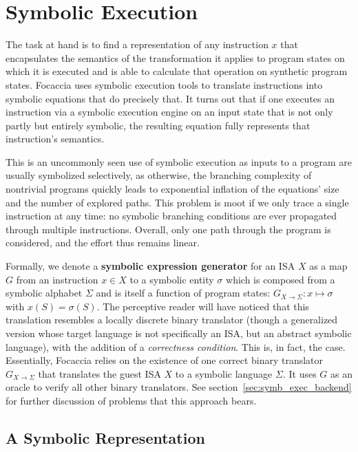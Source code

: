 \section{Symbolic Execution}\label{sec:symb_exec}

The task at hand is to find a representation of any instruction $x$ that encapsulates the semantics of the
transformation it applies to program states on which it is executed and is able to calculate that operation on synthetic
program states. Focaccia uses symbolic execution tools to translate instructions into symbolic equations that do
precisely that. It turns out that if one executes an instruction via a symbolic execution engine on an input state that
is not only partly but entirely symbolic, the resulting equation fully represents that instruction's semantics.

This is an uncommonly seen use of symbolic execution as inputs to a program are usually symbolized selectively, as
otherwise, the branching complexity of nontrivial programs quickly leads to exponential inflation of the equations' size
and the number of explored paths. This problem is moot if we only trace a single instruction at any time: no symbolic
branching conditions are ever propagated through multiple instructions.  Overall, only one path through the program is
considered, and the effort thus remains linear.

Formally, we denote a \textbf{symbolic expression generator} for an \ac{ISA} $X$ as a map $G$ from an instruction $x \in
X$ to a symbolic entity $\sigma$ which is composed from a symbolic alphabet $\Sigma$ and is itself a function of program
states: $G_{X \rightarrow \Sigma}: x \mapsto \sigma$ with $x(S) = \sigma(S)$. The perceptive reader will have noticed
that this translation resembles a locally discrete binary translator (though a generalized version whose target language
is not specifically an \ac{ISA}, but an abstract symbolic language), with the addition of a \textit{correctness
condition}. This is, in fact, the case. Essentially, Focaccia relies on the existence of one correct binary translator
$G_{X \rightarrow \Sigma}$ that translates the guest \ac{ISA} $X$ to a symbolic language $\Sigma$. It uses $G$ as an
oracle to verify all other binary translators. See section~\ref{sec:symb_exec_backend} for further discussion of
problems that this approach bears.

\subsection{A Symbolic Representation}

